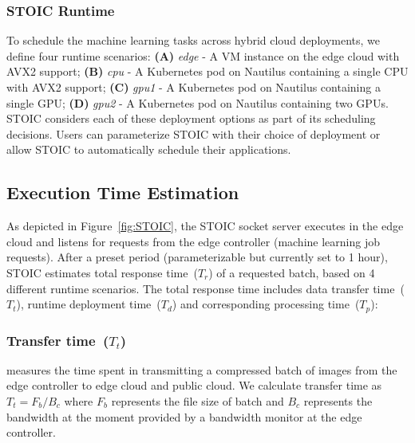  \BlankLine
 \subsubsection{STOIC Runtime}
 To schedule the machine learning tasks across hybrid cloud deployments, we define four runtime scenarios: \textbf{(A)} \textit{edge} - A VM instance on the edge cloud with AVX2 support; \textbf{(B)} \textit{cpu} - A Kubernetes pod on Nautilus containing a single CPU with AVX2 support; \textbf{(C)} \textit{gpu1} - A Kubernetes pod on Nautilus containing a single GPU; \textbf{(D)} \textit{gpu2} - A Kubernetes pod on Nautilus containing two GPUs. STOIC considers each of these deployment options as part of its scheduling decisions. Users can parameterize STOIC with their choice of deployment or allow STOIC to automatically schedule their applications.
 
 
 
 \subsection{Execution Time Estimation}
 As depicted in Figure~\ref{fig:STOIC}, the STOIC socket server executes in the edge cloud and listens for requests from the edge controller (machine learning job requests). After a preset period (parameterizable but currently set to 1 hour), STOIC estimates total response time~($T_r$) of a requested batch, based on 4 different runtime scenarios. The total response time includes data transfer time~($T_t$), runtime deployment time~($T_d$) and corresponding processing time~($T_p$):
 
 \subsubsection{Transfer time~($T_t$)} measures the time spent in transmitting a compressed batch of images from the edge controller to edge cloud and public cloud. We calculate transfer time as ${T_t = F_b / B_c}$ where $F_b$ represents the file size of batch and $B_c$ represents the bandwidth at the moment provided by a bandwidth monitor at the edge controller. 
 
